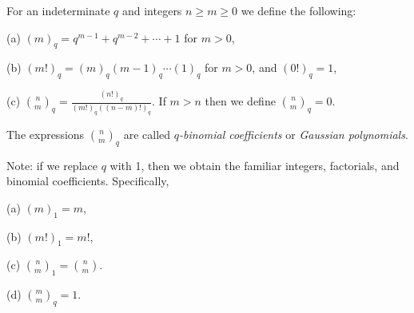 \documentclass[12pt]{article}
\begin{document}
For an indeterminate $q$ and integers $n \ge m \ge 0$
we define the following: \par
(a) $(m)_q = q^{m-1} + q^{m-2} + \cdots + 1$ for $m>0$, \par
(b) $(m!)_q = (m)_q (m-1)_q \cdots (1)_q$ for $m>0$, and $(0!)_q = 1$, \par
(c) ${n \choose m}_q = \frac{(n!)_q}{(m!)_q ((n-m)!)_q}$.
If $m>n$ then we define ${n \choose m}_q=0$. \par
The expressions ${n \choose m}_q$ are called
{\it $q$-binomial coefficients} or {\it Gaussian polynomials}.\par
Note: if we replace $q$ with 1, then we obtain the familiar integers, factorials, and binomial coefficients.  Specifically,\par
(a) $(m)_1 = m$, \par
(b) $(m!)_1 = m!$, \par
(c) ${n \choose m}_1 = {n \choose m}$.\par
(d) ${m \choose m}_q=1$.
\end{document}

